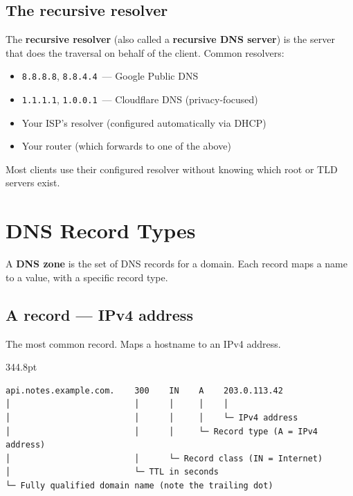 \subsection*{The recursive resolver}\label{27-domain-and-dns:the-recursive-resolver}

The \textbf{recursive resolver} (also called a \textbf{recursive DNS server}) is the server that does the traversal on behalf of the client. Common resolvers:

\begin{itemize}
\tightlist
\item
  \texttt{8.8.8.8}, \texttt{8.8.4.4}~--- Google Public DNS
\item
  \texttt{1.1.1.1}, \texttt{1.0.0.1}~--- Cloudflare DNS (privacy-focused)
\item
  Your ISP's resolver (configured automatically via DHCP)
\item
  Your router (which forwards to one of the above)
\end{itemize}

\noindent{}Most clients use their configured resolver without knowing which root or TLD servers exist.

\setcounter{section}{1}
\section{DNS Record Types}\label{27-domain-and-dns:272-dns-record-types}

A \textbf{DNS zone} is the set of DNS records for a domain. Each record maps a name to a value, with a specific record type.

\subsection*{A record --- IPv4 address}\label{27-domain-and-dns:a-record--ipv4-address}

The most common record. Maps a hostname to an IPv4 address.

\begin{diagrambox}[short]{344.8pt}
\begin{Verbatim}[fontsize=\fontsize{9.0}{8.55}\selectfont]
api.notes.example.com.    300    IN    A    203.0.113.42
│                         │      │     │    │
│                         │      │     │    └─ IPv4 address
│                         │      │     └─ Record type (A = IPv4 address)
│                         │      └─ Record class (IN = Internet)
│                         └─ TTL in seconds
└─ Fully qualified domain name (note the trailing dot)
\end{Verbatim}
\end{diagrambox}

